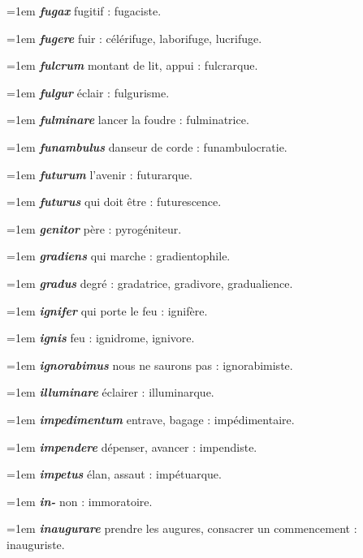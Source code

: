 \hangindent=1em \textbf{\textit{fugax}} fugitif : fugaciste.\par
\hangindent=1em \textbf{\textit{fugere}} fuir : célérifuge, laborifuge, lucrifuge.\par
\hangindent=1em \textbf{\textit{fulcrum}} montant de lit, appui : fulcrarque.\par
\hangindent=1em \textbf{\textit{fulgur}} éclair : fulgurisme.\par
\hangindent=1em \textbf{\textit{fulminare}} lancer la foudre : fulminatrice.\par
\hangindent=1em \textbf{\textit{funambulus}} danseur de corde : funambulocratie.\par
\hangindent=1em \textbf{\textit{futurum}} l'avenir : futurarque.\par
\hangindent=1em \textbf{\textit{futurus}} qui doit être : futurescence.\par
\hangindent=1em \textbf{\textit{genitor}} père : pyrogéniteur.\par
\hangindent=1em \textbf{\textit{gradiens}} qui marche : gradientophile.\par
\hangindent=1em \textbf{\textit{gradus}} degré : gradatrice, gradivore, gradualience.\par
\hangindent=1em \textbf{\textit{ignifer}} qui porte le feu : ignifère.\par
\hangindent=1em \textbf{\textit{ignis}} feu : ignidrome, ignivore.\par
\hangindent=1em \textbf{\textit{ignorabimus}} nous ne saurons pas : ignorabimiste.\par
\hangindent=1em \textbf{\textit{illuminare}} éclairer : illuminarque.\par
\hangindent=1em \textbf{\textit{impedimentum}} entrave, bagage : impédimentaire.\par
\hangindent=1em \textbf{\textit{impendere}} dépenser, avancer : impendiste.\par
\hangindent=1em \textbf{\textit{impetus}} élan, assaut : impétuarque.\par
\hangindent=1em \textbf{\textit{in-}} non : immoratoire.\par
\hangindent=1em \textbf{\textit{inaugurare}} prendre les augures, consacrer un commencement : inauguriste.\par
